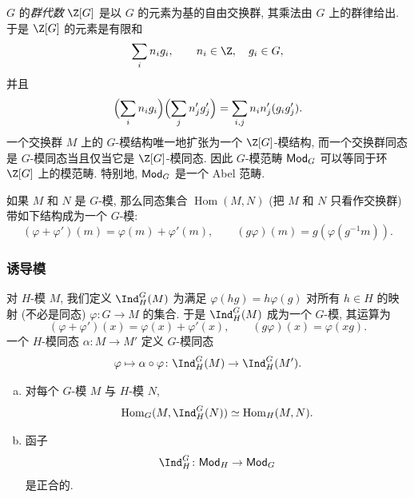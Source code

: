 \begin{remark}\label{rem:ii.1.1}
$G$ 的\emph{群代数} $\Z[G]$ 是以 $G$ 的元素为基的自由交换群, 其乘法由 $G$ 上的群律给出. 于是 $\Z[G]$ 的元素是有限和
\[
 \sum_i n_i g_i,\qquad n_i\in\Z,\quad g_i\in G,
\]
并且
\[
 \Bigl(\sum_i n_i g_i\Bigr)\Bigl(\sum_j n_j' g_j'\Bigr)=\sum_{i,j} n_i n_j'(g_i g_j').
\]
一个交换群 $M$ 上的 $G$-模结构唯一地扩张为一个 $\Z[G]$-模结构, 而一个交换群同态是 $G$-模同态当且仅当它是 $\Z[G]$-模同态. 因此 $G$-模范畴 $\mathsf{Mod}_G$ 可以等同于环 $\Z[G]$ 上的模范畴. 特别地, $\mathsf{Mod}_G$ 是一个 Abel 范畴.
\end{remark}

如果 $M$ 和 $N$ 是 $G$-模, 那么同态集合 $\operatorname{Hom}(M,N)$ (把 $M$ 和 $N$ 只看作交换群) 带如下结构成为一个 $G$-模:
\begin{equation*}
 (\varphi+\varphi')(m)=\varphi(m)+\varphi'(m),\qquad (g\varphi)(m)=g(\varphi(g^{-1}m)).
\tag{11}
\end{equation*}

\subsubsection*{诱导模}

对 $H$-模 $M$, 我们定义 $\Ind_H^G(M)$ 为满足 $\varphi(hg)=h\varphi(g)$ 对所有 $h\in H$ 的映射 (不必是同态) $\varphi\colon G\to M$ 的集合. 于是 $\Ind_H^G(M)$ 成为一个 $G$-模, 其运算为
\begin{equation*}
 (\varphi+\varphi')(x)=\varphi(x)+\varphi'(x),\qquad (g\varphi)(x)=\varphi(xg).
\tag{12}
\end{equation*}
一个 $H$-模同态 $\alpha\colon M\to M'$ 定义 $G$-模同态
\[
 \varphi\mapsto \alpha\circ\varphi\colon \Ind_H^G(M)\to \Ind_H^G(M').
\]

\begin{lemma}\label{lem:ii.1.2}
\begin{enumerate}[(a)]
\item 对每个 $G$-模 $M$ 与 $H$-模 $N$,
\[
 \operatorname{Hom}_G(M,\Ind_H^G(N))\simeq \operatorname{Hom}_H(M,N).
\]
\item 函子
\[
 \Ind_H^G\colon \Mod_H\to \Mod_G
\]
是正合的.
\end{enumerate}
\end{lemma}

